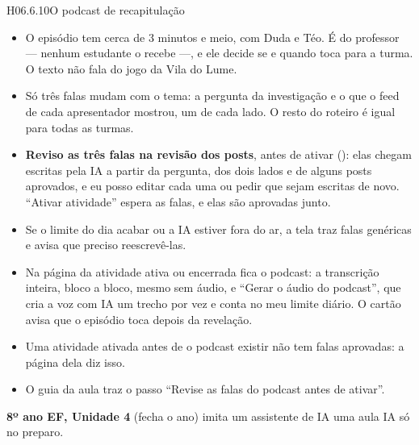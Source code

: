 \begin{historia}{H06.6.10}{O podcast de recapitulação}{\parcial}
\aceite
\begin{itemize}
  \item O episódio tem cerca de 3 minutos e meio, com Duda e Téo. É do
    professor --- nenhum estudante o recebe ---, e ele decide se e quando toca
    para a turma. O texto não fala do jogo da Vila do Lume.
  \item Só três falas mudam com o tema: a pergunta da investigação e o que o
    feed de cada apresentador mostrou, um de cada lado. O resto do roteiro é
    igual para todas as turmas.
  \item \textbf{Reviso as três falas na revisão dos posts}, antes de ativar
    (): elas chegam escritas pela IA a partir da pergunta, dos dois
    lados e de alguns posts aprovados, e eu posso editar cada uma ou pedir que
    sejam escritas de novo. \enquote{Ativar atividade} espera as falas, e elas
    são aprovadas junto.
  \item Se o limite do dia acabar ou a IA estiver fora do ar, a tela traz falas
    genéricas e avisa que preciso reescrevê-las.
  \item Na página da atividade ativa ou encerrada fica o podcast: a
    transcrição inteira, bloco a bloco, mesmo sem áudio, e \enquote{Gerar o
    áudio do podcast}, que cria a voz com IA um trecho por vez e conta no meu
    limite diário. O cartão avisa que o episódio toca depois da revelação.
  \item Uma atividade ativada antes de o podcast existir não tem falas
    aprovadas: a página dela diz isso.
  \item O guia da aula traz o passo \enquote{Revise as falas do podcast antes
    de ativar}.
\end{itemize}
\end{historia}


\textbf{8º ano EF, Unidade 4} (fecha o ano) \textperiodcentered{} imita um
assistente de IA \textperiodcentered{} uma aula \textperiodcentered{} IA só no
preparo.

